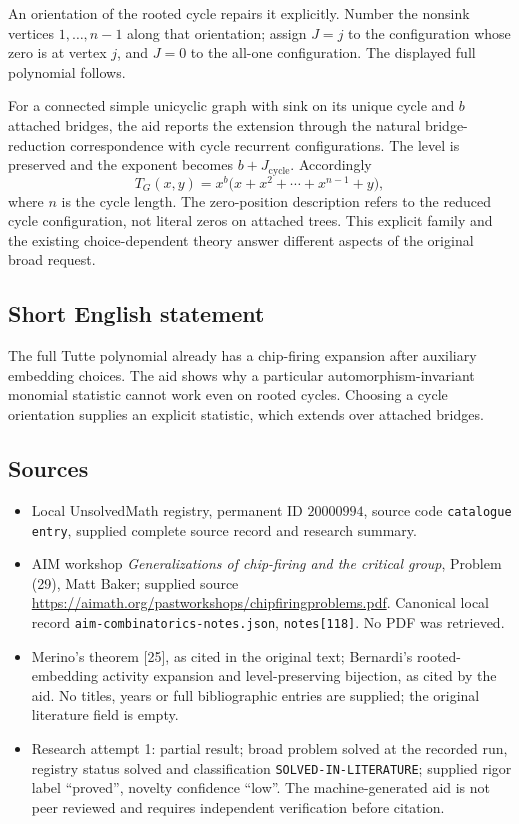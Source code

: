 \documentclass[11pt]{article}
\begin{document}
An orientation of the rooted cycle repairs it explicitly. Number the nonsink vertices $1,\ldots,n-1$ along that orientation; assign $J=j$ to the configuration whose zero is at vertex $j$, and $J=0$ to the all-one configuration. The displayed full polynomial follows.

For a connected simple unicyclic graph with sink on its unique cycle and $b$ attached bridges, the aid reports the extension through the natural bridge-reduction correspondence with cycle recurrent configurations. The level is preserved and the exponent becomes $b+J_{\mathrm{cycle}}$. Accordingly
\[
 T_G(x,y)=x^b\bigl(x+x^2+\cdots+x^{n-1}+y\bigr),
\]
where $n$ is the cycle length. The zero-position description refers to the reduced cycle configuration, not literal zeros on attached trees. This explicit family and the existing choice-dependent theory answer different aspects of the original broad request.
\subsection{Short English statement}
The full Tutte polynomial already has a chip-firing expansion after auxiliary embedding choices. The aid shows why a particular automorphism-invariant monomial statistic cannot work even on rooted cycles. Choosing a cycle orientation supplies an explicit statistic, which extends over attached bridges.
\subsection{Sources}
\begin{itemize}
\item Local UnsolvedMath registry, permanent ID $20000994$, source code \texttt{catalogue entry}, supplied complete source record and research summary.
\item AIM workshop \emph{Generalizations of chip-firing and the critical group}, Problem (29), Matt Baker; supplied source \url{https://aimath.org/pastworkshops/chipfiringproblems.pdf}. Canonical local record \texttt{aim-combinatorics-notes.json}, \texttt{notes[118]}. No PDF was retrieved.
\item Merino's theorem [25], as cited in the original text; Bernardi's rooted-embedding activity expansion and level-preserving bijection, as cited by the aid. No titles, years or full bibliographic entries are supplied; the original literature field is empty.
\item Research attempt 1: partial result; broad problem solved at the recorded run, registry status solved and classification \texttt{SOLVED-IN-LITERATURE}; supplied rigor label ``proved'', novelty confidence ``low''. The machine-generated aid is not peer reviewed and requires independent verification before citation.
\end{itemize}
\end{document}
